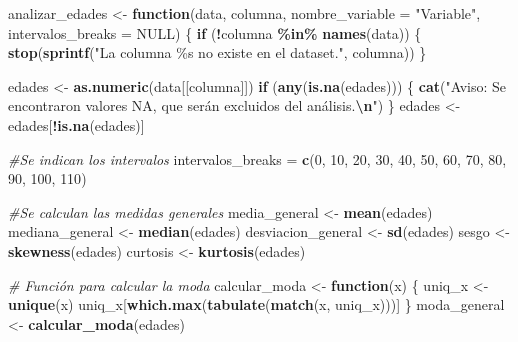 \documentclass[
]{article}
\newenvironment{Shaded}{\begin{snugshade}}{\end{snugshade}}
\newcommand{\AttributeTok}[1]{\textcolor[rgb]{0.13,0.29,0.53}{#1}}
\newcommand{\CommentTok}[1]{\textcolor[rgb]{0.56,0.35,0.01}{\textit{#1}}}
\newcommand{\ConstantTok}[1]{\textcolor[rgb]{0.56,0.35,0.01}{#1}}
\newcommand{\ControlFlowTok}[1]{\textcolor[rgb]{0.13,0.29,0.53}{\textbf{#1}}}
\newcommand{\DecValTok}[1]{\textcolor[rgb]{0.00,0.00,0.81}{#1}}
\newcommand{\FunctionTok}[1]{\textcolor[rgb]{0.13,0.29,0.53}{\textbf{#1}}}
\newcommand{\NormalTok}[1]{#1}
\newcommand{\OtherTok}[1]{\textcolor[rgb]{0.56,0.35,0.01}{#1}}
\newcommand{\SpecialCharTok}[1]{\textcolor[rgb]{0.81,0.36,0.00}{\textbf{#1}}}
\newcommand{\StringTok}[1]{\textcolor[rgb]{0.31,0.60,0.02}{#1}}
\begin{document}
\begin{Shaded}
\begin{Highlighting}[]
\NormalTok{analizar\_edades }\OtherTok{\textless{}{-}} \ControlFlowTok{function}\NormalTok{(data, columna, }\AttributeTok{nombre\_variable =} \StringTok{"Variable"}\NormalTok{, }\AttributeTok{intervalos\_breaks =} \ConstantTok{NULL}\NormalTok{) \{}
  \ControlFlowTok{if}\NormalTok{ (}\SpecialCharTok{!}\NormalTok{columna }\SpecialCharTok{\%in\%} \FunctionTok{names}\NormalTok{(data)) \{}
    \FunctionTok{stop}\NormalTok{(}\FunctionTok{sprintf}\NormalTok{(}\StringTok{"La columna \textquotesingle{}\%s\textquotesingle{} no existe en el dataset."}\NormalTok{, columna))}
\NormalTok{  \}}
  
\NormalTok{  edades }\OtherTok{\textless{}{-}} \FunctionTok{as.numeric}\NormalTok{(data[[columna]])}
  \ControlFlowTok{if}\NormalTok{ (}\FunctionTok{any}\NormalTok{(}\FunctionTok{is.na}\NormalTok{(edades))) \{}
    \FunctionTok{cat}\NormalTok{(}\StringTok{"Aviso: Se encontraron valores NA, que serán excluidos del análisis.}\SpecialCharTok{\textbackslash{}n}\StringTok{"}\NormalTok{)}
\NormalTok{  \}}
\NormalTok{  edades }\OtherTok{\textless{}{-}}\NormalTok{ edades[}\SpecialCharTok{!}\FunctionTok{is.na}\NormalTok{(edades)]}
  
  \CommentTok{\#Se indican los intervalos}
\NormalTok{  intervalos\_breaks }\OtherTok{=} \FunctionTok{c}\NormalTok{(}\DecValTok{0}\NormalTok{, }\DecValTok{10}\NormalTok{, }\DecValTok{20}\NormalTok{, }\DecValTok{30}\NormalTok{, }\DecValTok{40}\NormalTok{, }\DecValTok{50}\NormalTok{, }\DecValTok{60}\NormalTok{, }\DecValTok{70}\NormalTok{, }\DecValTok{80}\NormalTok{, }\DecValTok{90}\NormalTok{, }\DecValTok{100}\NormalTok{, }\DecValTok{110}\NormalTok{)}
  
  \CommentTok{\#Se calculan las medidas generales}
\NormalTok{  media\_general }\OtherTok{\textless{}{-}} \FunctionTok{mean}\NormalTok{(edades)}
\NormalTok{  mediana\_general }\OtherTok{\textless{}{-}} \FunctionTok{median}\NormalTok{(edades)}
\NormalTok{  desviacion\_general }\OtherTok{\textless{}{-}} \FunctionTok{sd}\NormalTok{(edades)}
\NormalTok{  sesgo }\OtherTok{\textless{}{-}} \FunctionTok{skewness}\NormalTok{(edades)}
\NormalTok{  curtosis }\OtherTok{\textless{}{-}} \FunctionTok{kurtosis}\NormalTok{(edades)}
  
  \CommentTok{\# Función para calcular la moda}
\NormalTok{  calcular\_moda }\OtherTok{\textless{}{-}} \ControlFlowTok{function}\NormalTok{(x) \{}
\NormalTok{    uniq\_x }\OtherTok{\textless{}{-}} \FunctionTok{unique}\NormalTok{(x)}
\NormalTok{    uniq\_x[}\FunctionTok{which.max}\NormalTok{(}\FunctionTok{tabulate}\NormalTok{(}\FunctionTok{match}\NormalTok{(x, uniq\_x)))]}
\NormalTok{  \}}
\NormalTok{  moda\_general }\OtherTok{\textless{}{-}} \FunctionTok{calcular\_moda}\NormalTok{(edades)}
  

\end{Highlighting}
\end{Shaded}
\end{document}
